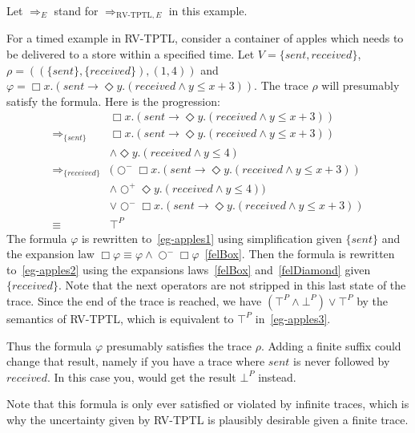 \documentclass[a4paper]{article}
\newcommand{\sn}{\bigcirc^+}
\newcommand{\wn}{\bigcirc^-}
\newcommand{\rw}[1]{\Rightarrow_{#1}}
\begin{document}
\begin{eg}[Apples]
  Let $\rw{E}$ stand for $\rw{\text{RV-TPTL},E}$ in this example.

  For a timed example in RV-TPTL, consider a container of apples which needs to be delivered to a store within a specified time.
  Let $V=\{sent, received\}$,
  \(\rho=((\{sent\},\{received\}),(1,4))\)
  and \(\varphi=\Box x. (sent \to \Diamond y. (received \land y \leq x + 3))\).
  The trace $\rho$ will presumably satisfy the formula.
  Here is the progression:
  \begin{align}
    &\Box x. (sent \to \Diamond y. (received \land y \leq x + 3))\nonumber\\
    \rw{\{sent\}}
    &\Box x. (sent \to \Diamond y. (received \land y \leq x + 3))\nonumber\\
    &\land \Diamond y. (received \land y \leq 4)
    \label{eg-apples1}\\
    \rw{\{received\}}
    &(\wn \Box x. (sent \to \Diamond y. (received \land y \leq x + 3))\nonumber\\
    &\land \sn \Diamond y. (received \land y \leq 4))\nonumber\\
    &\lor \wn \Box x. (sent \to \Diamond y. (received \land y \leq x + 3))\label{eg-apples2}\\
    \equiv
    &\top^P\label{eg-apples3}
  \end{align}
  The formula $\varphi$ is rewritten to~\eqref{eg-apples1} using simplification given $\{sent\}$ and the expansion law $\Box \varphi \equiv \varphi \land \wn \Box \varphi$~\eqref{felBox}.
  Then the formula is rewritten to~\eqref{eg-apples2} using the expansions laws~\eqref{felBox} and~\eqref{felDiamond} given $\{received\}$.
  Note that the next operators are not stripped in this last state of the trace.
  Since the end of the trace is reached, we have $(\top^P \land \bot^P) \lor \top^P$ by the semantics of RV-TPTL, which is equivalent to $\top^P$ in~\eqref{eg-apples3}.

  Thus the formula $\varphi$ presumably satisfies the trace $\rho$.
  Adding a finite suffix could change that result, namely if you have a trace where $sent$ is never followed by $received$.
  In this case you, would get the result $\bot^P$ instead.

  Note that this formula is only ever satisfied or violated by infinite traces, which is why the uncertainty given by RV-TPTL is plausibly desirable given a finite trace.
\end{eg}
\end{document}
